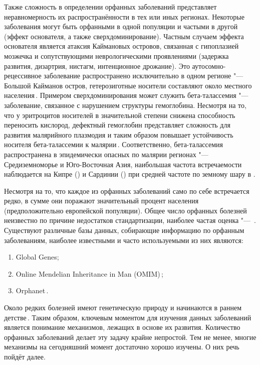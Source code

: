 \documentclass[a4paper,14pt]{extarticle}
\newcommand{\thousands}{тыс.}
\newcommand{\ecitep}[1]{\textenglish{\citep{#1}}}
\begin{document}
Также сложность в определении орфанных заболеваний представляет неравномерность их распространённости в тех или иных регионах.
Некоторые заболевания могут быть орфанными в одной популяции и частыми в другой (эффект основателя, а также сверхдоминирование).
Частным случаем эффекта основателя является атаксия Каймановых островов, связанная с гипоплазией мозжечка и сопутствующими неврологическими проявлениями (задержка развития, дизартрия, нистагм, интенционное дрожание).
Это аутосомно-рецессивное заболевание распространено исключительно в одном регионе "--- Большой Кайманов остров, гетерозиготные носители составляют около  местного населения\,\ecitep{Bomar_2003}.
Примером сверхдоминирования может служить бета-талассемия "--- заболевание, связанное с нарушением структуры гемоглобина.
Несмотря на то, что у эритроцитов носителей в значительной степени снижена способность переносить кислород, дефектный гемоглобин представляет сложность для развития малярийного плазмодия и таким образом повышает устойчивость носителя бета-талассемии к малярии\,\ecitep{Galanello_2010}.
Соответственно, бета-талассемия распространена в эпидемически опасных по малярии регионах "--- Средиземноморье и Юго-Восточная Азия, наибольшая частота встречаемости наблюдается на Кипре () и Сардинии () при средней частоте по земному шару в .

Несмотря на то, что каждое из орфанных заболеваний само по себе встречается редко, в сумме они поражают значительный процент населения (предположительно  европейской популяции).
Общее число орфанных болезней неизвестно по причине недостатков стандартизации, наиболее частая оценка "--- \numprint[\thousands]{5--8}\,\ecitep{The_Lancet_Neurology_2011}.
Существуют различные базы данных, собирающие информацию по орфанным заболеваниям, наиболее известными и часто используемыми из них являются:

\begin{enumerate}
	\item Global Genes;
	\item Online Mendelian Inheritance in Man (OMIM\textregistered)\,\ecitep{Amberger_2014};
	\item Orphanet\,\ecitep{Orphanet}.
\end{enumerate}

Около  редких болезней имеют генетическую природу и начинаются в раннем детстве\,\ecitep{The_Lancet_Neurology_2011}.
Таким образом, ключевым моментом для изучения данных заболеваний является понимание механизмов, лежащих в основе их развития.
Количество орфанных заболеваний делает эту задачу крайне непростой.
Тем не менее, многие механизмы на сегодняшний момент достаточно хорошо изучены.
О них речь пойдёт далее.
\end{document}
